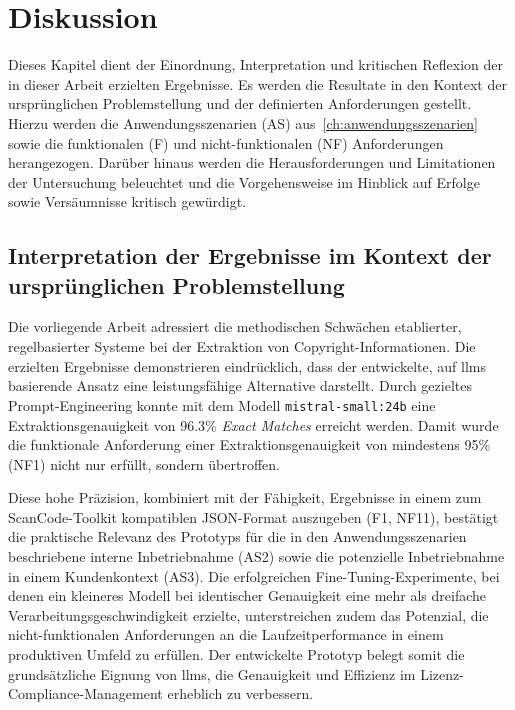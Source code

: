 \chapter{Diskussion}\label{ch:diskussion}

Dieses Kapitel dient der Einordnung, Interpretation und kritischen Reflexion der in dieser Arbeit erzielten Ergebnisse.
Es werden die Resultate in den Kontext der ursprünglichen Problemstellung und der definierten Anforderungen gestellt.
Hierzu werden die Anwendungsszenarien (AS) aus~\ref{ch:anwendungsszenarien} sowie die funktionalen (F) und nicht-funktionalen (NF) Anforderungen herangezogen.
Darüber hinaus werden die Herausforderungen und Limitationen der Untersuchung beleuchtet und die Vorgehensweise im Hinblick auf Erfolge sowie Versäumnisse kritisch gewürdigt.


\section{Interpretation der Ergebnisse im Kontext der ursprünglichen Problemstellung}

Die vorliegende Arbeit adressiert die methodischen Schwächen etablierter, regelbasierter Systeme bei der Extraktion von Copyright-Informationen.
Die erzielten Ergebnisse demonstrieren eindrücklich, dass der entwickelte, auf \glspl{llm} basierende Ansatz eine leistungsfähige Alternative darstellt.
Durch gezieltes Prompt-Engineering konnte mit dem Modell \texttt{mistral-small:24b} eine Extraktionsgenauigkeit von \num{96,3}\% \textit{Exact Matches} erreicht werden.
Damit wurde die funktionale Anforderung einer Extraktionsgenauigkeit von mindestens \num{95}\% (NF1) nicht nur erfüllt, sondern übertroffen.

Diese hohe Präzision, kombiniert mit der Fähigkeit, Ergebnisse in einem zum ScanCode-Toolkit kompatiblen JSON-Format auszugeben (F1, NF11), bestätigt die praktische Relevanz des Prototyps für die in den Anwendungsszenarien beschriebene interne Inbetriebnahme (AS2) sowie die potenzielle Inbetriebnahme in einem Kundenkontext (AS3).
Die erfolgreichen Fine-Tuning-Experimente, bei denen ein kleineres Modell bei identischer Genauigkeit eine mehr als dreifache Verarbeitungsgeschwindigkeit erzielte, unterstreichen zudem das Potenzial, die nicht-funktionalen Anforderungen an die Laufzeitperformance in einem produktiven Umfeld zu erfüllen.
Der entwickelte Prototyp belegt somit die grundsätzliche Eignung von \glspl{llm}, die Genauigkeit und Effizienz im Lizenz-Compliance-Management erheblich zu verbessern.

